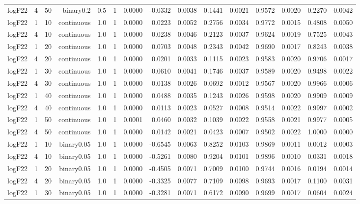 \begin{longtable}{rrrrrrrrrrrrrrr}
  logF22 & 4 & 50 & binary0.2 & 0.5 & 1 & 0.0000 & -0.0332 & 0.0038 & 0.1441 & 0.0021 & 0.9572 & 0.0020 & 0.2270 & 0.0042 \\ 
  logF22 & 1 & 10 & continuous & 1.0 & 1 & 0.0000 & 0.0223 & 0.0052 & 0.2756 & 0.0034 & 0.9772 & 0.0015 & 0.4808 & 0.0050 \\ 
  logF22 & 4 & 10 & continuous & 1.0 & 1 & 0.0000 & 0.0238 & 0.0046 & 0.2123 & 0.0037 & 0.9624 & 0.0019 & 0.7525 & 0.0043 \\ 
  logF22 & 1 & 20 & continuous & 1.0 & 1 & 0.0000 & 0.0703 & 0.0048 & 0.2343 & 0.0042 & 0.9690 & 0.0017 & 0.8243 & 0.0038 \\ 
  logF22 & 4 & 20 & continuous & 1.0 & 1 & 0.0000 & 0.0201 & 0.0033 & 0.1115 & 0.0023 & 0.9583 & 0.0020 & 0.9706 & 0.0017 \\ 
  logF22 & 1 & 30 & continuous & 1.0 & 1 & 0.0000 & 0.0610 & 0.0041 & 0.1746 & 0.0037 & 0.9589 & 0.0020 & 0.9498 & 0.0022 \\ 
  logF22 & 4 & 30 & continuous & 1.0 & 1 & 0.0000 & 0.0138 & 0.0026 & 0.0692 & 0.0012 & 0.9567 & 0.0020 & 0.9966 & 0.0006 \\ 
  logF22 & 1 & 40 & continuous & 1.0 & 1 & 0.0000 & 0.0488 & 0.0035 & 0.1243 & 0.0026 & 0.9598 & 0.0020 & 0.9909 & 0.0009 \\ 
  logF22 & 4 & 40 & continuous & 1.0 & 1 & 0.0000 & 0.0113 & 0.0023 & 0.0527 & 0.0008 & 0.9514 & 0.0022 & 0.9997 & 0.0002 \\ 
  logF22 & 1 & 50 & continuous & 1.0 & 1 & 0.0001 & 0.0460 & 0.0032 & 0.1039 & 0.0022 & 0.9558 & 0.0021 & 0.9977 & 0.0005 \\ 
  logF22 & 4 & 50 & continuous & 1.0 & 1 & 0.0000 & 0.0142 & 0.0021 & 0.0423 & 0.0007 & 0.9502 & 0.0022 & 1.0000 & 0.0000 \\ 
  logF22 & 1 & 10 & binary0.05 & 1.0 & 1 & 0.0000 & -0.6545 & 0.0063 & 0.8252 & 0.0103 & 0.9869 & 0.0011 & 0.0012 & 0.0003 \\ 
  logF22 & 4 & 10 & binary0.05 & 1.0 & 1 & 0.0000 & -0.5261 & 0.0080 & 0.9204 & 0.0101 & 0.9896 & 0.0010 & 0.0331 & 0.0018 \\ 
  logF22 & 1 & 20 & binary0.05 & 1.0 & 1 & 0.0000 & -0.4505 & 0.0071 & 0.7009 & 0.0100 & 0.9744 & 0.0016 & 0.0194 & 0.0014 \\ 
  logF22 & 4 & 20 & binary0.05 & 1.0 & 1 & 0.0000 & -0.3325 & 0.0077 & 0.7109 & 0.0098 & 0.9693 & 0.0017 & 0.1100 & 0.0031 \\ 
  logF22 & 1 & 30 & binary0.05 & 1.0 & 1 & 0.0000 & -0.3281 & 0.0071 & 0.6172 & 0.0090 & 0.9699 & 0.0017 & 0.0604 & 0.0024 \\ 

\end{longtable}
